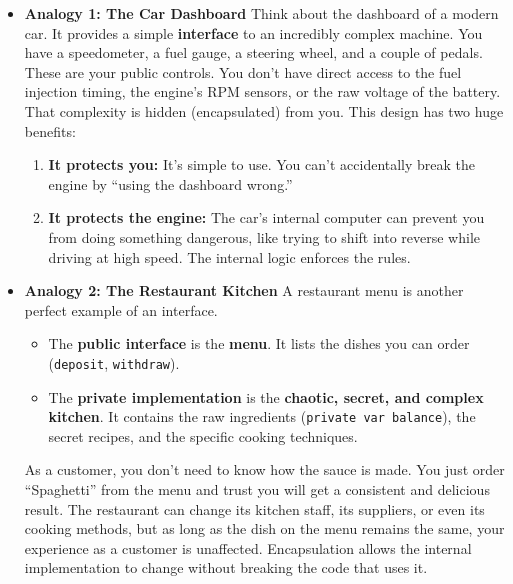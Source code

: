 \documentclass[
  letterpaper,
  DIV=11,
  numbers=noendperiod]{scrreprt}
\providecommand{\tightlist}{%
  \setlength{\itemsep}{0pt}\setlength{\parskip}{0pt}}
\begin{document}
\begin{itemize}
\tightlist
\item
  \textbf{Analogy 1: The Car Dashboard} Think about the dashboard of a
  modern car. It provides a simple \textbf{interface} to an incredibly
  complex machine. You have a speedometer, a fuel gauge, a steering
  wheel, and a couple of pedals. These are your public controls. You
  don't have direct access to the fuel injection timing, the engine's
  RPM sensors, or the raw voltage of the battery. That complexity is
  hidden (encapsulated) from you. This design has two huge benefits:

  \begin{enumerate}
  \def\labelenumi{\arabic{enumi}.}
  \tightlist
  \item
    \textbf{It protects you:} It's simple to use. You can't accidentally
    break the engine by ``using the dashboard wrong.''
  \item
    \textbf{It protects the engine:} The car's internal computer can
    prevent you from doing something dangerous, like trying to shift
    into reverse while driving at high speed. The internal logic
    enforces the rules.
  \end{enumerate}
\item
  \textbf{Analogy 2: The Restaurant Kitchen} A restaurant menu is
  another perfect example of an interface.

  \begin{itemize}
  \tightlist
  \item
    The \textbf{public interface} is the \textbf{menu}. It lists the
    dishes you can order (\texttt{deposit}, \texttt{withdraw}).
  \item
    The \textbf{private implementation} is the \textbf{chaotic, secret,
    and complex kitchen}. It contains the raw ingredients
    (\texttt{private\ var\ balance}), the secret recipes, and the
    specific cooking techniques.
  \end{itemize}

  As a customer, you don't need to know how the sauce is made. You just
  order ``Spaghetti'' from the menu and trust you will get a consistent
  and delicious result. The restaurant can change its kitchen staff, its
  suppliers, or even its cooking methods, but as long as the dish on the
  menu remains the same, your experience as a customer is unaffected.
  Encapsulation allows the internal implementation to change without
  breaking the code that uses it.
\end{itemize}
\end{document}
